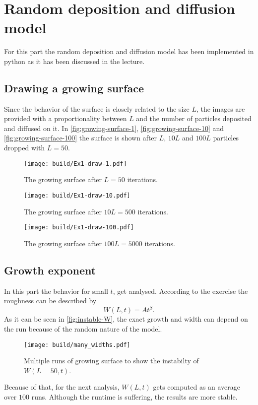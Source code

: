 \section{Random deposition and diffusion model}
\label{sec:exercise-1}
For this part the random deposition and diffusion model has been implemented in python as it has been discussed in the
lecture. 

\subsection{Drawing a growing surface}
\label{sec:RDD-drawing}
Since the behavior of the surface is closely related to the size $L$, the images are provided with a proportionality
between $L$ and the number of particles deposited and diffused on it. In 
\autoref{fig:growing-surface-1},
\autoref{fig:growing-surface-10} and
\autoref{fig:growing-surface-100}
the surface is shown after $L$, $10L$ and $100L$ particles dropped with $L=50$.
\begin{figure}
	\centering
  \texttt{[image: build/Ex1-draw-1.pdf]}
  \caption{The growing surface after $L = 50$ iterations.}
  \label{fig:growing-surface-1}
\end{figure}
\begin{figure}
	\centering
  \texttt{[image: build/Ex1-draw-10.pdf]}
  \caption{The growing surface after $10L = 500$ iterations.}
  \label{fig:growing-surface-10}
\end{figure}
\begin{figure}
	\centering
  \texttt{[image: build/Ex1-draw-100.pdf]}
  \caption{The growing surface after $100L = 5000$ iterations.}
  \label{fig:growing-surface-100}
\end{figure}

\subsection{Growth exponent }
In this part the behavior for small $t$, get analysed. According to the exercise the roughness can be described by
\[
   W(L,t) = At^\beta.
\]
As it can be seen in \autoref{fig:instable-W}, the exact growth and width can depend on the run because of the random
nature of the model. 

\begin{figure}
	\centering
  \texttt{[image: build/many\_widths.pdf]}
  \caption{Multiple runs of growing surface to show the instabilty of $W(L=50,t)$.}
  \label{fig:instable-W}
\end{figure}
Because of that, for the next analysis, $W(L,t)$ gets computed as an average over $100$ runs. Although the runtime is
suffering, the results are more stable.

